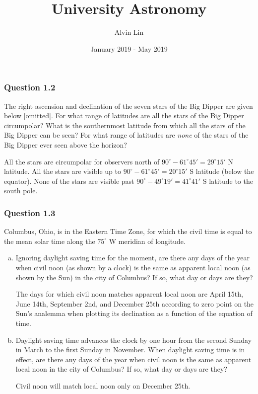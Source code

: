 \documentclass{math}
\title{University Astronomy}
\author{Alvin Lin}
\date{January 2019 - May 2019}
\begin{document}
\maketitle

\subsubsection*{Question 1.2}
The right ascension and declination of the seven stars of the Big Dipper are
given below [omitted]. For what range of latitudes are all the stars of the Big
Dipper circumpolar? What is the southernmost latitude from which all the stars
of the Big Dipper can be seen? For what range of latitudes are \textit{none} of
the stars of the Big Dipper ever seen above the horizon? \par
All the stars are circumpolar for observers north of \( 90^{\circ}-
61^{\circ}45' = 29^{\circ}15' \) N latitude. All the stars are visible up to
\( 90^{\circ}-61^{\circ}45' = 20^{\circ}15' \) S latitude (below the
equator). None of the stars are visible past \( 90^{\circ}-49^{\circ}19' =
41^{\circ}41' \) S latitude to the south pole.

\subsubsection*{Question 1.3}
Columbus, Ohio, is in the Eastern Time Zone, for which the civil time is equal
to the mean solar time along the \( 75^{\circ} \) W meridian of longitude.
\begin{enumerate}[(a)]
  \item Ignoring daylight saving time for the moment, are there any days of the
    year when civil noon (as shown by a clock) is the same as apparent local
    noon (as shown by the Sun) in the city of Columbus? If so, what day or days
    are they? \par
    The days for which civil noon matches apparent local noon are April 15th,
    June 14th, September 2nd, and December 25th according to zero point on the
    Sun's analemma when plotting its declination as a function of the equation
    of time.
  \item Daylight saving time advances the clock by one hour from the second
    Sunday in March to the first Sunday in November. When daylight saving time
    is in effect, are there any days of the year when civil noon is the same as
    apparent local noon in the city of Columbus? If so, what day or days are
    they? \par
    Civil noon will match local noon only on December 25th.
\end{enumerate}
\end{document}
